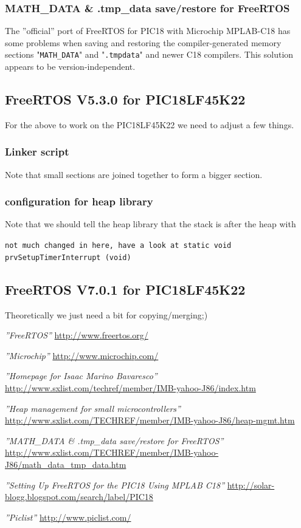 \documentclass[a4paper,11pt]{article}
\begin{document}
\subsubsection{MATH\_DATA \& .tmp\_data save/restore for
FreeRTOS~\cite{isaac-math}}
The ''official'' port of FreeRTOS for PIC18 with Microchip MPLAB-C18 has some
problems when saving and restoring the compiler-generated memory sections
"{\tt MATH\_DATA}" and "{\tt .tmpdata}" and newer C18 compilers. This solution
appears to be version-independent.


\subsection{FreeRTOS V5.3.0 for PIC18LF45K22}
For the above to work on the PIC18LF45K22 we need to adjust a few things.
\subsubsection{Linker script}
Note that small sections are joined together to form a bigger section.

\subsubsection{configuration for heap library}
Note that we should tell the heap library that the stack is after the heap with

\lstset{language=c}

{\tt not much changed in here, have a look at {\tt static void
prvSetupTimerInterrupt (void)}}


\subsection{FreeRTOS V7.0.1 for PIC18LF45K22}
Theoretically we just need a bit for copying/merging;)

\pagebreak

\begin{thebibliography}{}

   \textsl{''FreeRTOS''}
  \url{http://www.freertos.org/}

   \textsl{''Microchip''}
  \url{http://www.microchip.com/}

   \textsl{''Homepage for Isaac Marino Bavaresco''}
  \url{http://www.sxlist.com/techref/member/IMB-yahoo-J86/index.htm}
  
   \textsl{''Heap management for small microcontrollers''}
  \url{http://www.sxlist.com/TECHREF/member/IMB-yahoo-J86/heap-mgmt.htm}
  
   \textsl{''MATH\_DATA \& .tmp\_data save/restore for
  FreeRTOS''}
  \url{http://www.sxlist.com/TECHREF/member/IMB-yahoo-J86/math_data_tmp_data.htm}

   \textsl{''Setting Up FreeRTOS for the PIC18 Using MPLAB C18''}
  \url{http://solar-blogg.blogspot.com/search/label/PIC18}

   \textsl{''Piclist''} 
  \url{http://www.piclist.com/}

\end{thebibliography}
\end{document}
